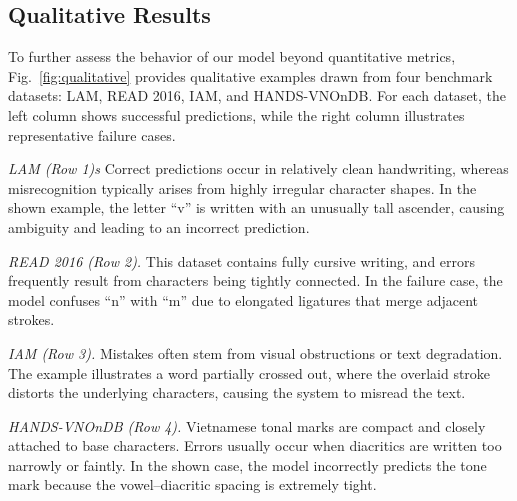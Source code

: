 \documentclass[final,5p,times]{elsarticle}
\begin{document}
\subsection{Qualitative Results}


To further assess the behavior of our model beyond quantitative metrics,
Fig.~\ref{fig:qualitative} provides qualitative examples drawn from four benchmark datasets:
LAM, READ 2016, IAM, and HANDS-VNOnDB.
For each dataset, the left column shows successful predictions, while the right column illustrates representative failure cases.

\textit{LAM (Row 1)s}
Correct predictions occur in relatively clean handwriting, whereas misrecognition typically arises from highly irregular character shapes.
In the shown example, the letter ``v'' is written with an unusually tall ascender, causing ambiguity and leading to an incorrect prediction.

\textit{READ 2016 (Row 2).}
This dataset contains fully cursive writing, and errors frequently result from characters being tightly connected.
In the failure case, the model confuses ``n'' with ``m'' due to elongated ligatures that merge adjacent strokes.

\textit{IAM (Row 3).}
Mistakes often stem from visual obstructions or text degradation.
The example illustrates a word partially crossed out, where the overlaid stroke distorts the underlying characters, causing the system to misread the text.

\textit{HANDS-VNOnDB (Row 4).}
Vietnamese tonal marks are compact and closely attached to base characters.
Errors usually occur when diacritics are written too narrowly or faintly.
In the shown case, the model incorrectly predicts the tone mark because the vowel–diacritic spacing is extremely tight.
\end{document}
